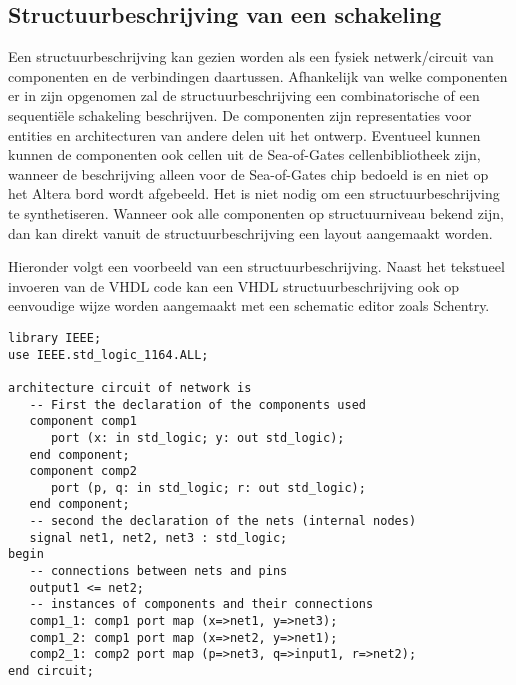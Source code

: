 \subsection{Structuurbeschrijving van een schakeling}

Een structuurbeschrijving kan gezien worden als een
fysiek netwerk/circuit van componenten en de verbindingen
daartussen.
Afhankelijk van welke componenten er in zijn opgenomen
zal de structuurbeschrijving een combinatorische
of een sequenti\"ele schakeling beschrijven.
De componenten zijn representaties voor entities en
architecturen van andere delen
uit het ontwerp.
Eventueel kunnen kunnen de componenten ook
cellen uit de Sea-of-Gates cellenbibliotheek zijn,
wanneer de beschrijving alleen voor de Sea-of-Gates chip 
bedoeld is en niet op het Altera bord wordt afgebeeld.
Het is niet nodig om een structuurbeschrijving te synthetiseren.
Wanneer ook alle componenten op structuurniveau bekend zijn, 
dan kan direkt vanuit de structuurbeschrijving een layout 
aangemaakt worden.

Hieronder volgt een voorbeeld van een structuurbeschrijving.
Naast het tekstueel invoeren van de VHDL code kan een
VHDL structuurbeschrijving ook op eenvoudige wijze worden
aangemaakt met een schematic editor zoals Schentry.
\begin{verbatim}
library IEEE;
use IEEE.std_logic_1164.ALL;

architecture circuit of network is
   -- First the declaration of the components used
   component comp1
      port (x: in std_logic; y: out std_logic);
   end component;
   component comp2
      port (p, q: in std_logic; r: out std_logic);
   end component;
   -- second the declaration of the nets (internal nodes)
   signal net1, net2, net3 : std_logic;
begin
   -- connections between nets and pins
   output1 <= net2;
   -- instances of components and their connections 
   comp1_1: comp1 port map (x=>net1, y=>net3);
   comp1_2: comp1 port map (x=>net2, y=>net1);
   comp2_1: comp2 port map (p=>net3, q=>input1, r=>net2);
end circuit;
\end{verbatim}
\cleardoublepage

